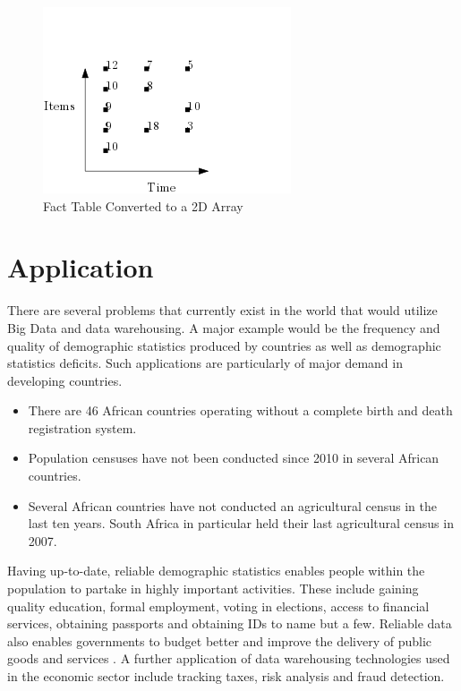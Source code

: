  \begin{figure}[H]
	\centering
	\includegraphics[width=0.6\linewidth]{exampleDataWarehouse}
	\caption{Fact Table Converted to a 2D Array}
	\label{fig:exampleDataWarehousing}
\end{figure}

\section{Application}
There are several problems that currently exist in the world that would utilize Big Data and data warehousing. A major example would be the frequency and quality of demographic statistics produced by countries as well as demographic statistics deficits. Such applications are particularly of major demand in developing countries.

\begin{itemize}
	\item There are 46 African countries operating without a complete birth and death registration system.
	\item Population censuses have not been conducted since 2010 in several African countries.
	\item Several African countries have not conducted an agricultural census in the last ten years. South Africa in particular held their last agricultural census in 2007.
\end{itemize}

Having up-to-date, reliable demographic statistics enables people within the population to partake in highly important activities. These include gaining quality education, formal employment, voting in elections, access to financial services, obtaining passports and obtaining IDs to name but a few. Reliable data also enables governments to budget better and improve the delivery of public goods and services \cite{mo:2015:sin}. A further application of data warehousing technologies used in the economic sector include tracking taxes, risk analysis and fraud detection. 


